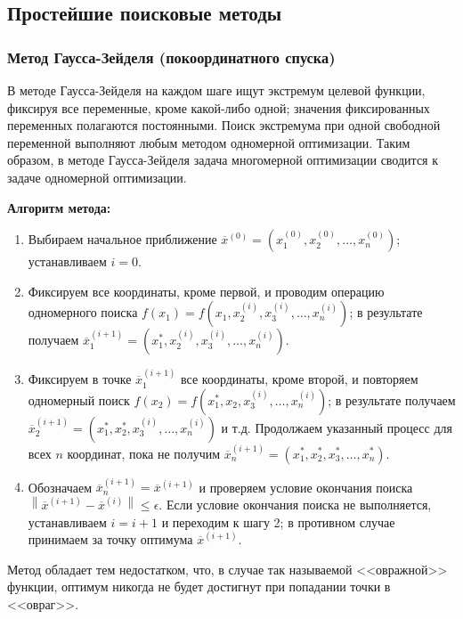 \documentclass[a4paper,12pt]{report}
\begin{document}
\subsection{Простейшие поисковые методы}

\subsubsection{Метод Гаусса-Зейделя (покоординатного спуска)}
В методе Гаусса-Зейделя на каждом шаге ищут экстремум целевой функции, фиксируя все переменные, кроме какой-либо одной; значения фиксированных переменных полагаются постоянными. Поиск экстремума при одной свободной переменной выполняют любым методом одномерной оптимизации. Таким образом, в методе Гаусса-Зейделя задача многомерной оптимизации сводится к задаче одномерной оптимизации.

\textbf{Алгоритм метода:}
\begin{enumerate}
\item Выбираем начальное приближение $\overline{x}^{(0)} = (x^{(0)}_{1}, x^{(0)}_{2}, \ldots, x^{(0)}_{n})$; устанавливаем $i = 0$.
\item Фиксируем все координаты, кроме первой, и проводим операцию одномерного поиска $f(x_{1}) = f(x_{1}, x^{(i)}_{2}, x^{(i)}_{3}, \ldots, x^{(i)}_{n})$; в результате получаем $\overline{x}^{(i+1)}_{1} = (x^{*}_{1}, x^{(i)}_{2}, x^{(i)}_{3}, \ldots, x^{(i)}_{n})$.
\item Фиксируем в точке $\overline{x}^{(i+1)}_{1}$ все координаты, кроме второй, и повторяем одномерный поиск $f(x_{2}) = f(x^{*}_{1}, x_{2}, x^{(i)}_{3}, \ldots, x^{(i)}_{n})$; в результате получаем $\overline{x}^{(i+1)}_{2} = (x^{*}_{1}, x^{*}_{2}, x^{(i)}_{3}, \ldots, x^{(i)}_{n})$ и т.д. Продолжаем указанный процесс для всех $n$ координат, пока не получим $\overline{x}^{(i+1)}_{n} = (x^{*}_{1}, x^{*}_{2}, x^{*}_{3}, \ldots, x^{*}_{n})$.
\item Обозначаем $\overline{x}^{(i+1)}_{n} = \overline{x}^{(i+1)}$ и проверяем условие окончания поиска $\left\|\overline{x}^{(i+1)} - \overline{x}^{(i)}\right\| \leq \epsilon$. Если условие окончания поиска не выполняется, устанавливаем $i = i + 1$ и переходим к шагу 2; в противном случае принимаем за точку оптимума $\overline{x}^{(i+1)}$.
\end{enumerate}

Метод обладает тем недостатком, что, в случае так называемой <<овражной>> функции, оптимум никогда не будет достигнут при попадании точки в <<овраг>>.
\end{document}
